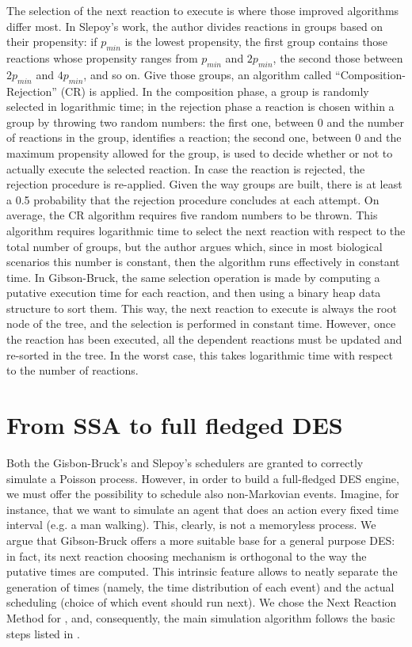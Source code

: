 \documentclass[12pt,a4paper,twoside,openright]{book}
\begin{document}
The selection of the next reaction to execute is where those improved algorithms differ most.
%
In Slepoy's work, the author divides reactions in groups based on their propensity: if $p_{min}$ is the lowest propensity, the first group contains those reactions whose propensity ranges from $p_{min}$ and $2 p_{min}$, the second those between $2 p_{min}$ and $4 p_{min}$, and so on.
%
Give those groups, an algorithm called ``Composition-Rejection'' (CR) is applied.
%
In the composition phase, a group is randomly selected in logarithmic time; in the rejection phase a reaction is chosen within a group by throwing two random numbers: the first one, between $0$ and the number of reactions in the group, identifies a reaction; the second one, between $0$ and the maximum propensity allowed for the group, is used to decide whether or not to actually execute the selected reaction.
%
In case the reaction is rejected, the rejection procedure is re-applied.
%
Given the way groups are built, there is at least a 0.5 probability that the rejection procedure concludes at each attempt.
%
On average, the CR algorithm requires five random numbers to be thrown.
%
This algorithm requires logarithmic time to select the next reaction with respect to the total number of groups, but the author argues which, since in most biological scenarios this number is constant, then the algorithm runs effectively in constant time.
%
In Gibson-Bruck, the same selection operation is made by computing a putative execution time for each reaction, and then using a binary heap data structure to sort them.
%
This way, the next reaction to execute is always the root node of the tree, and the selection is performed in constant time.
%
However, once the reaction has been executed, all the dependent reactions must be updated and re-sorted in the tree. In the worst case, this takes logarithmic time with respect to the number of reactions.

\section{From SSA to full fledged DES}

Both the Gisbon-Bruck's and Slepoy's schedulers are granted to correctly simulate a Poisson process.
%
However, in order to build a full-fledged DES engine, we must offer the possibility to schedule also non-Markovian events.
%
Imagine, for instance, that we want to simulate an agent that does an action every fixed time interval (e.g. a man walking).
%
This, clearly, is not a memoryless process.
%
We argue that Gibson-Bruck offers a more suitable base for a general purpose DES: in fact, its next reaction choosing mechanism is orthogonal to the way the putative times are computed.
%
This intrinsic feature allows to neatly separate the generation of times (namely, the time distribution of each event) and the actual scheduling (choice of which event should run next).
%
We chose the Next Reaction Method for \alchemist{}, and, consequently, the main simulation algorithm follows the basic steps listed in .
\end{document}
